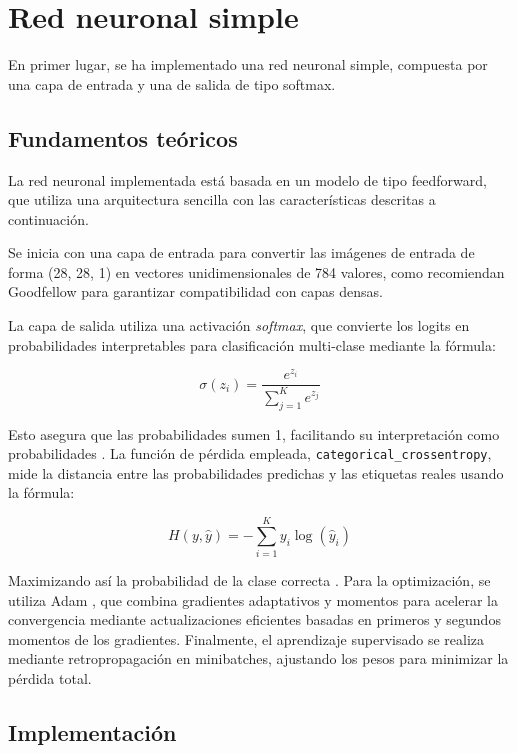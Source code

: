 \section{Red neuronal simple}

En primer lugar, se ha implementado una red neuronal simple, compuesta por una capa de entrada y una de salida de tipo softmax.

\subsection{Fundamentos teóricos}

La red neuronal implementada está basada en un modelo de tipo feedforward, que utiliza una arquitectura sencilla con las características descritas a continuación.

Se inicia con una capa de entrada para convertir las imágenes de entrada de forma (28, 28, 1) en vectores unidimensionales de 784 valores, como recomiendan Goodfellow \parencite{goodfellow2016deep} para garantizar compatibilidad con capas densas.

La capa de salida utiliza una activación \textit{softmax}, que convierte los logits en probabilidades interpretables para clasificación multi-clase mediante la fórmula:

\[
\sigma(z_i) = \frac{e^{z_i}}{\sum_{j=1}^{K} e^{z_j}}
\]

Esto asegura que las probabilidades sumen 1, facilitando su interpretación como probabilidades \parencite{bishop2006pattern}. La función de pérdida empleada, \texttt{categorical\_crossentropy}, mide la distancia entre las probabilidades predichas y las etiquetas reales usando la fórmula:

\[
H(y, \hat{y}) = -\sum_{i=1}^{K} y_i \log(\hat{y}_i)
\]

Maximizando así la probabilidad de la clase correcta \parencite{murphy2012machine}. Para la optimización, se utiliza Adam \parencite{kingma2014adam}, que combina gradientes adaptativos y momentos para acelerar la convergencia mediante actualizaciones eficientes basadas en primeros y segundos momentos de los gradientes. Finalmente, el aprendizaje supervisado se realiza mediante retropropagación \parencite{rumelhart1986learning} en minibatches, ajustando los pesos para minimizar la pérdida total.


\subsection{Implementación}

